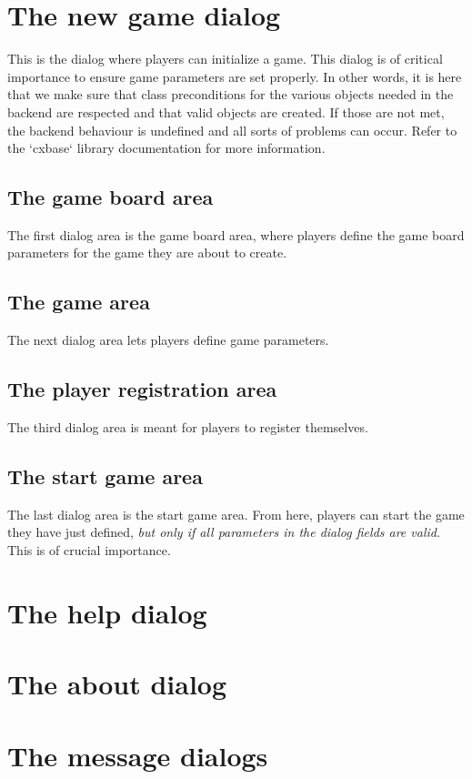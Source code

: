 \section{The new game dialog} \label{dlg:NewGame}
This is the dialog where players can initialize a game. This dialog is of critical
importance to ensure game parameters are set properly. In other words, it is here
that we make sure that class preconditions for the various objects needed in the
backend are respected and that valid objects are created. If those are not met,
the backend behaviour is undefined and all sorts of problems can occur. Refer to
the `cxbase` library documentation for more information.

  \subsection{The game board area}
  The first dialog area is the game board area, where players define the game
  board parameters for the game they are about to create.

  \subsection{The game area}
  The next dialog area lets players define game parameters. 


  \subsection{The player registration area} \label{dlg:PlayerReg}
  The third dialog area is meant for players to register themselves.

  \subsection{The start game area}
  The last dialog area is the start game area. From here, players can start the
  game they have just defined, \textit{but only if all parameters in the dialog
  fields are valid}. This is of crucial importance.

\section{The help dialog} \label{dlg:Help}
\section{The about  dialog} \label{dlg:AboutCX}
\section{The message dialogs} \label{dlg::message}
